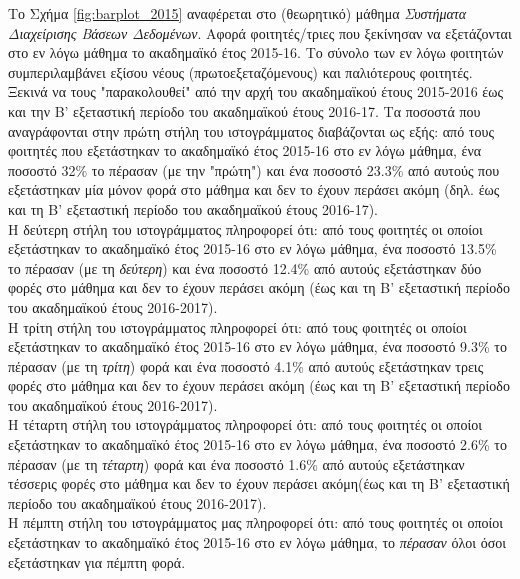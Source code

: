 \documentclass[12pt,a4paper,final]{article}
\begin{document}
Το Σχήμα \ref{fig:barplot_2015} αναφέρεται στο (θεωρητικό) μάθημα \textit{Συστήματα Διαχείρισης Βάσεων Δεδομένων}. Αφορά φοιτητές/τριες που ξεκίνησαν να εξετάζονται στο εν λόγω μάθημα το ακαδημαϊκό έτος 2015-16. Το σύνολο των εν λόγω φοιτητών  συμπεριλαμβάνει εξίσου νέους (πρωτοεξεταζόμενους) και παλιότερους φοιτητές. Ξεκινά να τους "παρακολουθεί" από την αρχή του ακαδημαϊκού έτους 2015-2016 έως και την Β' εξεταστική περίοδο του ακαδημαϊκού έτους 2016-17. Τα ποσοστά που αναγράφονται στην πρώτη στήλη του ιστογράμματος διαβάζονται ως εξής: από τους φοιτητές που εξετάστηκαν  το ακαδημαϊκό έτος 2015-16 στο εν λόγω μάθημα, ένα ποσοστό 32\% το πέρασαν (με την "πρώτη") και ένα ποσοστό    23.3\% από αυτούς που εξετάστηκαν μία μόνον φορά στο μάθημα και δεν το έχουν περάσει ακόμη (δηλ. έως και τη Β' εξεταστική περίοδο  του ακαδημαϊκού έτους 2016-17).\\
Η δεύτερη στήλη του ιστογράμματος πληροφορεί ότι: από τους φοιτητές οι οποίοι εξετάστηκαν το ακαδημαϊκό έτος  2015-16 στο εν λόγω μάθημα, ένα ποσοστό 13.5\%  το πέρασαν (με τη \textit{δεύτερη}) και ένα ποσοστό 12.4\%  από αυτούς εξετάστηκαν δύο φορές στο μάθημα και  δεν το έχουν περάσει ακόμη (έως και τη Β' εξεταστική περίοδο του ακαδημαϊκού έτους 2016-2017).\\
Η τρίτη στήλη του ιστογράμματος πληροφορεί ότι: από τους φοιτητές οι οποίοι εξετάστηκαν το ακαδημαϊκό έτος  2015-16 στο εν λόγω μάθημα, ένα ποσοστό 9.3\%  το πέρασαν (με τη \textit{τρίτη}) φορά και ένα ποσοστό 4.1\%  από αυτούς εξετάστηκαν τρεις  φορές στο μάθημα και  δεν το έχουν περάσει ακόμη (έως και τη Β' εξεταστική περίοδο του ακαδημαϊκού έτους 2016-2017).\\
Η τέταρτη στήλη του ιστογράμματος πληροφορεί ότι: από τους φοιτητές οι οποίοι εξετάστηκαν το ακαδημαϊκό έτος  2015-16 στο εν λόγω μάθημα, ένα ποσοστό 2.6\%  το πέρασαν (με τη \textit{τέταρτη}) φορά και ένα ποσοστό 1.6\%  από αυτούς εξετάστηκαν τέσσερις  φορές στο μάθημα και  δεν το έχουν περάσει ακόμη(έως και τη Β' εξεταστική περίοδο του ακαδημαϊκού έτους 2016-2017).\\
Η πέμπτη στήλη του ιστογράμματος μας  πληροφορεί ότι: από τους φοιτητές οι οποίοι εξετάστηκαν το ακαδημαϊκό έτος  2015-16 στο εν λόγω μάθημα, το \textit{πέρασαν} όλοι όσοι εξετάστηκαν για πέμπτη φορά. \medskip
\end{document}
